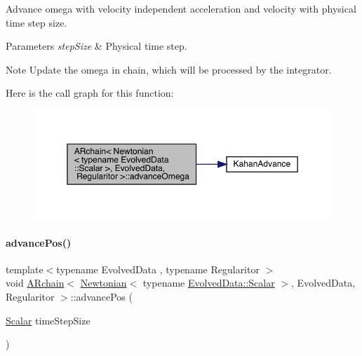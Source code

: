 Advance omega with velocity independent acceleration and velocity with physical time step size. 
\begin{DoxyParams}{Parameters}
{\em step\+Size} & Physical time step. \\
\hline
\end{DoxyParams}
\begin{DoxyNote}{Note}
Update the omega in chain, which will be processed by the integrator. 
\end{DoxyNote}
Here is the call graph for this function\+:\nopagebreak
\begin{figure}[H]
\begin{center}
\leavevmode
\includegraphics[width=350pt]{class_a_rchain_3_01_newtonian_3_01typename_01_evolved_data_1_1_scalar_01_4_00_01_evolved_data_00_01_regularitor_01_4_a8427d55e9b05fca4a1db2b9024940e06_cgraph}
\end{center}
\end{figure}
\mbox{\label{class_a_rchain_3_01_newtonian_3_01typename_01_evolved_data_1_1_scalar_01_4_00_01_evolved_data_00_01_regularitor_01_4_adffd5a74134d2a87e4f07908ea5beef4}} 
\paragraph{\texorpdfstring{advance\+Pos()}{advancePos()}}
{\footnotesize\ttfamily template$<$typename Evolved\+Data , typename Regularitor $>$ \\
void \mbox{\hyperlink{class_a_rchain}{A\+Rchain}}$<$ \mbox{\hyperlink{class_newtonian}{Newtonian}}$<$ typename \mbox{\hyperlink{class_a_rchain_a707e42a79e4744424a34c9007e84ee07}{Evolved\+Data\+::\+Scalar}} $>$, Evolved\+Data, Regularitor $>$\+::advance\+Pos (\begin{DoxyParamCaption}\item[{\mbox{\hyperlink{class_a_rchain_3_01_newtonian_3_01typename_01_evolved_data_1_1_scalar_01_4_00_01_evolved_data_00_01_regularitor_01_4_a2c77dc1b58a25ac5c6ee95dd7809f693}{Scalar}}}]{time\+Step\+Size }\end{DoxyParamCaption})}



